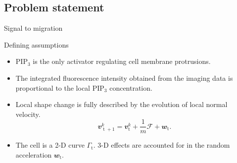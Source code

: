 \documentclass[mathserif,11pt]{beamer}
\DeclareMathOperator{\td}{\mathrm{t}}
\begin{document}
\subsection{Problem statement}
\begin{frame}{Signal to migration}
\centering
\scalebox{1}{}
\vfil
{}
\end{frame}
\begin{frame}{Defining assumptions}
\begin{itemize}
	\item PIP$_3$ is the only activator regulating cell membrane protrusions.
	\item The integrated 
fluorescence intensity obtained from the imaging data is proportional to the local PIP$_3$ concentration.
	\item Local shape change is fully described by the evolution of local normal velocity.
	\begin{equation*}
	\mathbfit{v}_{\td+1}^{k} = \mathbfit{v}_{\td}^{k} + \frac{1}{m} \mathcal{F} + \mathbfit{w}_{\td}.
	\end{equation*}
	\item The cell is a 2-D curve $\Gamma_{\td}$. 3-D effects are accounted for in the random acceleration $\mathbfit{w}_{\td}$.
\end{itemize}
\end{frame}
\end{document}
